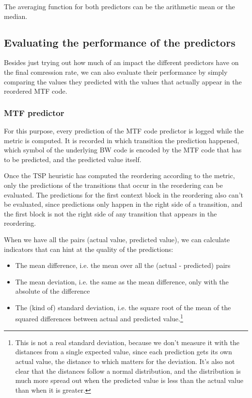 \documentclass[a4paper]{scrreprt}
\begin{document}
The averaging function for both predictors can be the arithmetic mean or the
median.

\subsection{Evaluating the performance of the predictors}

Besides just trying out how much of an impact the different predictors have on
the final comression rate, we can also evaluate their performance by simply
comparing the values they predicted with the values that actually appear in the
reordered MTF code.

\subsubsection{MTF predictor}

For this purpose, every prediction of the MTF code predictor is logged while the
metric is computed. It is recorded in which transition the prediction happened,
which symbol of the underlying BW code is encoded by the MTF code that has to be
predicted, and the predicted value itself.

Once the TSP heuristic has computed the reordering according to the metric,
only the predictions of the transitions that occur in the reordering can be
evaluated. The predictions for the first context block in the reordering also
can't be evaluated, since predictions only happen in the right side of a
transition, and the first block is not the right side of any transition that
appears in the reordering.


When we have all the pairs (actual value, predicted value), we can calculate
indicators that can hint at the quality of the predictions:
\begin{itemize}
  \item The mean difference, i.e. the mean over all the (actual - predicted)
  pairs
  \item The mean deviation, i.e. the same as the mean difference, only with the
  absolute of the difference
  \item The (kind of) standard deviation, i.e. the square root of the mean of
  the squared differences between actual and predicted value.\footnote{This is
  not a real standard deviation, because we don't measure it with the distances
  from a single expected value, since each prediction gets its own actual
  value, the distance to which matters for the deviation. It's also not clear
  that the distances follow a normal distribution, and the distribution is much
  more spread out when the predicted value is less than the actual value than
  when it is greater.}
\end{itemize}
\end{document}
